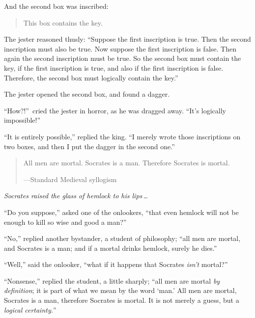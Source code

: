 { And the second box was inscribed:

\begin{quote}
{
  This box contains the key.}
\end{quote}


 The jester reasoned thusly: ``Suppose the first
inscription is true. Then the second inscription must also be true. Now
suppose the first inscription is false. Then again the second
inscription must be true. So the second box must contain the key, if
the first inscription is true, and also if the first inscription is
false. Therefore, the second box must logically contain the
key.''


 The jester opened the second box, and found a dagger.


 ``How?!''~cried the jester in
horror, as he was dragged away. ``It's
logically impossible!''


 ``It is entirely possible,''
replied the king. ``I merely wrote those inscriptions
on two boxes, and then I put the dagger in the second
one.''

\myendsectiontext


\bigskip


\begin{quote}

 All men are mortal. Socrates is a man. Therefore Socrates is
mortal.

{\raggedleft
 {}---Standard Medieval syllogism
\par}
\end{quote}



 \textit{Socrates raised the glass of hemlock to his lips\,\ldots}


 ``Do you suppose,'' asked one
of the onlookers, ``that even hemlock will not be
enough to kill so wise and good a man?''


 ``No,'' replied another
bystander, a student of philosophy; ``all men are
mortal, and Socrates is a man; and if a mortal drinks hemlock, surely
he dies.''


 ``Well,'' said the onlooker,
``what if it happens that Socrates
\textit{isn't} mortal?''


 ``Nonsense,'' replied the
student, a little sharply; ``all men are mortal
\textit{by definition}; it is part of what we mean by the word
`man.' All men are mortal, Socrates is a
man, therefore Socrates is mortal. It is not merely a guess, but a
\textit{logical certainty.}''


}
